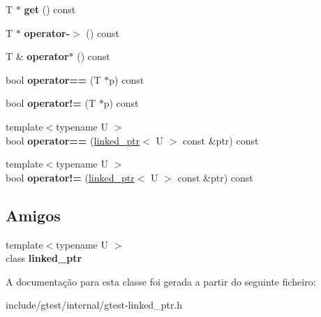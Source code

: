 \begin{DoxyCompactItemize}
\item 
\hypertarget{classtesting_1_1internal_1_1linked__ptr_a6ea8584d9bcad13c3266834f5ce5e771}{T $\ast$ {\bfseries get} () const }\label{classtesting_1_1internal_1_1linked__ptr_a6ea8584d9bcad13c3266834f5ce5e771}

\item 
\hypertarget{classtesting_1_1internal_1_1linked__ptr_aa878c3e874242fb3cd2aa14ec603aa25}{T $\ast$ {\bfseries operator-\/$>$} () const }\label{classtesting_1_1internal_1_1linked__ptr_aa878c3e874242fb3cd2aa14ec603aa25}

\item 
\hypertarget{classtesting_1_1internal_1_1linked__ptr_aec393cbd60f96defde36ef8a69d94254}{T \& {\bfseries operator$\ast$} () const }\label{classtesting_1_1internal_1_1linked__ptr_aec393cbd60f96defde36ef8a69d94254}

\item 
\hypertarget{classtesting_1_1internal_1_1linked__ptr_abe2154fd3ad3574dfe6f2320bc1debc4}{bool {\bfseries operator==} (T $\ast$p) const }\label{classtesting_1_1internal_1_1linked__ptr_abe2154fd3ad3574dfe6f2320bc1debc4}

\item 
\hypertarget{classtesting_1_1internal_1_1linked__ptr_a3685f9661bbe410cfa58fea2f14396b7}{bool {\bfseries operator!=} (T $\ast$p) const }\label{classtesting_1_1internal_1_1linked__ptr_a3685f9661bbe410cfa58fea2f14396b7}

\item 
\hypertarget{classtesting_1_1internal_1_1linked__ptr_a3b46c9ecfd928673a524dcb3c70fd2ad}{{\footnotesize template$<$typename U $>$ }\\bool {\bfseries operator==} (\hyperlink{classtesting_1_1internal_1_1linked__ptr}{linked\-\_\-ptr}$<$ U $>$ const \&ptr) const }\label{classtesting_1_1internal_1_1linked__ptr_a3b46c9ecfd928673a524dcb3c70fd2ad}

\item 
\hypertarget{classtesting_1_1internal_1_1linked__ptr_a6449584b90a09a313300599fb3a23633}{{\footnotesize template$<$typename U $>$ }\\bool {\bfseries operator!=} (\hyperlink{classtesting_1_1internal_1_1linked__ptr}{linked\-\_\-ptr}$<$ U $>$ const \&ptr) const }\label{classtesting_1_1internal_1_1linked__ptr_a6449584b90a09a313300599fb3a23633}

\end{DoxyCompactItemize}
\subsection*{Amigos}
\begin{DoxyCompactItemize}
\item 
\hypertarget{classtesting_1_1internal_1_1linked__ptr_a7763f286ca03a7f7363a033d996c8c1c}{{\footnotesize template$<$typename U $>$ }\\class {\bfseries linked\-\_\-ptr}}\label{classtesting_1_1internal_1_1linked__ptr_a7763f286ca03a7f7363a033d996c8c1c}

\end{DoxyCompactItemize}


A documentação para esta classe foi gerada a partir do seguinte ficheiro\-:\begin{DoxyCompactItemize}
\item 
include/gtest/internal/gtest-\/linked\-\_\-ptr.\-h\end{DoxyCompactItemize}
